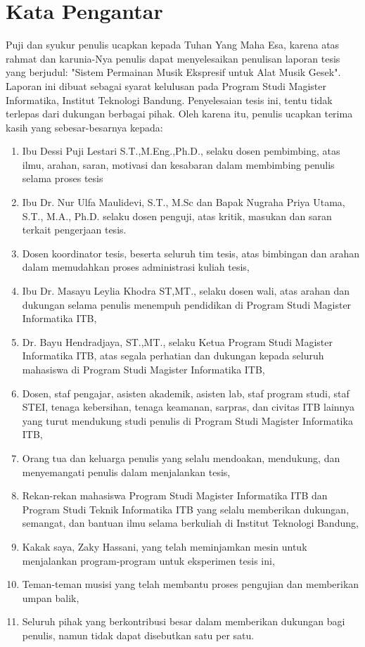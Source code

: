 \chapter*{Kata Pengantar}

Puji dan syukur penulis ucapkan kepada Tuhan Yang Maha Esa, karena atas rahmat dan karunia-Nya penulis dapat menyelesaikan penulisan laporan tesis yang berjudul: "Sistem Permainan Musik Ekspresif untuk Alat Musik Gesek". Laporan ini dibuat sebagai syarat kelulusan pada Program Studi Magister Informatika, Institut Teknologi Bandung. Penyelesaian tesis ini, tentu tidak terlepas dari dukungan berbagai pihak. Oleh karena itu, penulis ucapkan terima kasih yang sebesar-besarnya kepada:

\begin{enumerate}
\item Ibu Dessi Puji Lestari S.T.,M.Eng.,Ph.D., selaku dosen pembimbing, atas ilmu, arahan, saran, motivasi dan kesabaran dalam membimbing penulis selama proses tesis
\item Ibu Dr. Nur Ulfa Maulidevi, S.T., M.Sc dan Bapak Nugraha Priya Utama, S.T., M.A., Ph.D. selaku dosen penguji, atas kritik, masukan dan saran terkait pengerjaan tesis. %
% 
\item %
Dosen koordinator tesis, beserta seluruh tim tesis, atas bimbingan dan arahan dalam memudahkan proses administrasi kuliah tesis,
\item Ibu Dr. Masayu Leylia Khodra ST,MT., selaku dosen wali, atas arahan dan dukungan selama penulis menempuh pendidikan di Program Studi Magister Informatika ITB,
\item Dr. Bayu Hendradjaya, ST.,MT., selaku Ketua Program Studi Magister Informatika ITB, atas segala perhatian dan dukungan kepada seluruh mahasiswa di Program Studi Magister Informatika ITB,
\item Dosen, staf pengajar, asisten akademik, asisten lab, staf program studi, staf STEI, tenaga kebersihan, tenaga keamanan, sarpras, dan civitas ITB lainnya yang turut mendukung studi penulis di Program Studi Magister Informatika ITB,
\item Orang tua dan keluarga penulis yang selalu mendoakan, mendukung, dan menyemangati penulis dalam menjalankan tesis,
\item Rekan-rekan mahasiswa Program Studi Magister Informatika ITB dan Program Studi Teknik Informatika ITB yang selalu memberikan dukungan, semangat, dan bantuan ilmu selama berkuliah di Institut Teknologi Bandung,
\item Kakak saya, Zaky Hassani, yang telah meminjamkan mesin untuk menjalankan program-program untuk eksperimen tesis ini,
\item Teman-teman musisi yang telah membantu proses pengujian dan memberikan umpan balik,
\item Seluruh pihak yang berkontribusi besar dalam memberikan dukungan bagi penulis, namun tidak dapat disebutkan satu per satu.
\end{enumerate}

